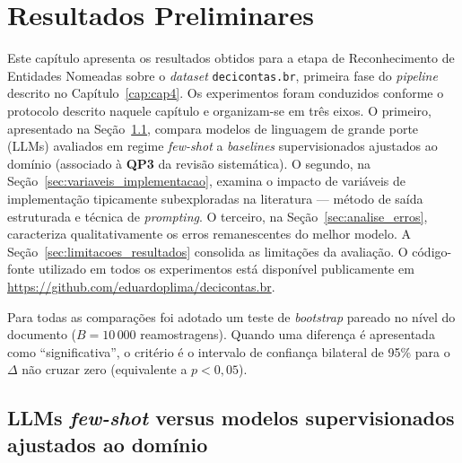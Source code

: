 \chapter{Resultados Preliminares}
\label{cap:cap5}

Este capítulo apresenta os resultados obtidos para a etapa de Reconhecimento de Entidades Nomeadas sobre o \textit{dataset} \texttt{decicontas.br}, primeira fase do \textit{pipeline} descrito no Capítulo~\ref{cap:cap4}. Os experimentos foram conduzidos conforme o protocolo descrito naquele capítulo e organizam-se em três eixos. O primeiro, apresentado na Seção~\ref{sec:llm_vs_supervisionados}, compara modelos de linguagem de grande porte (LLMs) avaliados em regime \textit{few-shot} a \textit{baselines} supervisionados ajustados ao domínio (associado à \textbf{QP3} da revisão sistemática). O segundo, na Seção~\ref{sec:variaveis_implementacao}, examina o impacto de variáveis de implementação tipicamente subexploradas na literatura --- método de saída estruturada e técnica de \textit{prompting}. O terceiro, na Seção~\ref{sec:analise_erros}, caracteriza qualitativamente os erros remanescentes do melhor modelo. A Seção~\ref{sec:limitacoes_resultados} consolida as limitações da avaliação. O código-fonte utilizado em todos os experimentos está disponível publicamente em \url{https://github.com/eduardoplima/decicontas.br}.

Para todas as comparações foi adotado um teste de \textit{bootstrap} pareado no nível do documento ($B = 10\,000$ reamostragens). Quando uma diferença é apresentada como ``significativa'', o critério é o intervalo de confiança bilateral de 95\% para o $\Delta$ não cruzar zero (equivalente a $p < 0{,}05$).

\section{LLMs \textit{few-shot} versus modelos supervisionados ajustados ao domínio}
\label{sec:llm_vs_supervisionados}

